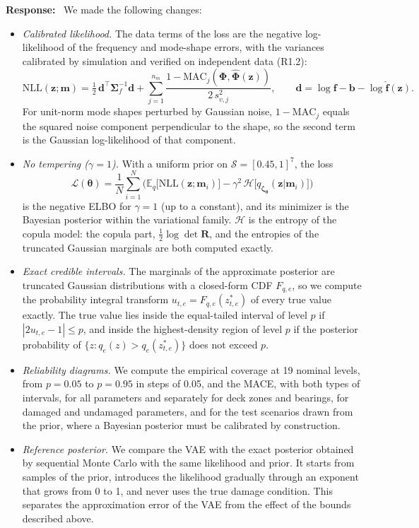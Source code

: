 \documentclass[11pt]{article}
\newenvironment{response}{\par\smallskip\noindent\color{resp}\textbf{Response:}\ }{\par}
\newcommand{\m}{\mathbf{m}}
\newcommand{\z}{\mathbf{z}}
\newcommand{\f}{\mathbf{f}}
\begin{document}
\begin{response}
We made the following changes:
\begin{itemize}[leftmargin=*]
\item \emph{Calibrated likelihood.} The data terms of the loss are the negative log-likelihood of the frequency and
mode-shape errors, with the variances calibrated by simulation and verified on independent data (R1.2):
\begin{equation}
\mathrm{NLL}(\z;\m)=\tfrac12\,\mathbf{d}^{\top}\bm{\Sigma}_f^{-1}\mathbf{d}
+\sum_{j=1}^{n_m}\frac{1-\mathrm{MAC}_j(\bm{\Phi},\hat{\bm{\Phi}}(\z))}{2\,s_{v,j}^2},\qquad
\mathbf{d}=\log\f-\mathbf{b}-\log\hat{\f}(\z).
\label{eq:nll}
\end{equation}
For unit-norm mode shapes perturbed by Gaussian noise, $1-\mathrm{MAC}_j$ equals the squared noise component
perpendicular to the shape, so the second term is the Gaussian log-likelihood of that component.
\item \emph{No tempering ($\gamma=1$).} With a uniform prior on $\mathcal{S}=[0.45,1]^7$, the loss
\begin{equation}
\mathcal{L}(\bm\theta)=\frac1N\sum_{i=1}^N\Big(\mathbb{E}_{q}\big[\mathrm{NLL}(\z;\m_i)\big]
-\gamma^2\,\mathcal{H}\big[q_{\bm\zeta_{\bm\theta}}(\z|\m_i)\big]\Big)
\label{eq:loss}
\end{equation}
is the negative ELBO for $\gamma=1$ (up to a constant), and its minimizer is the Bayesian posterior within the
variational family. $\mathcal{H}$ is the entropy of the copula model: the copula part, $\frac12\log\det\mathbf{R}$, and
the entropies of the truncated Gaussian marginals are both computed exactly.
\item \emph{Exact credible intervals.} The marginals of the approximate posterior are truncated Gaussian distributions with a
closed-form CDF $F_{q,e}$, so we compute the probability integral transform $u_{t,e}=F_{q,e}(z^*_{t,e})$ of every true
value exactly. The true value lies inside the equal-tailed interval of level $p$ if $|2u_{t,e}-1|\le p$, and inside the
highest-density region of level $p$ if the posterior probability of $\{z: q_e(z)>q_e(z^*_{t,e})\}$ does not exceed $p$.
\item \emph{Reliability diagrams.} We compute the empirical coverage at 19 nominal levels, from $p=0.05$ to $p=0.95$ in
steps of 0.05, and the MACE, with both types of intervals, for all parameters and separately for deck zones and bearings, for damaged and
undamaged parameters, and for the test scenarios drawn from the prior, where a Bayesian posterior must be calibrated by
construction.
\item \emph{Reference posterior.} We compare the VAE with the exact posterior obtained by sequential Monte Carlo with
the same likelihood and prior. It starts from samples of the prior, introduces the likelihood gradually through an
exponent that grows from 0 to 1, and never uses the true damage condition. This separates the approximation error of
the VAE from the effect of the bounds described above.
\end{itemize}


\end{response}
\end{document}
